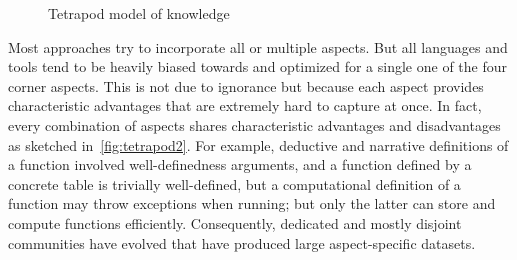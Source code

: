 \begin{figure}[hbt]
\begin{center}
\end{center}
\caption{Tetrapod model of knowledge}\label{fig:tetrapod}
\end{figure}

Most approaches try to incorporate all or multiple aspects.
But all languages and tools tend to be heavily biased towards and optimized for a single one of the four corner aspects.
This is not due to ignorance but because each aspect provides characteristic advantages that are extremely hard to capture at once.
In fact, every combination of aspects shares characteristic advantages and disadvantages as sketched in~\autoref{fig:tetrapod2}.
For example, deductive and narrative definitions of a function involved well-definedness arguments, and a function defined by a concrete table is trivially well-defined, but a computational definition of a function may throw exceptions when running; but only the latter can store and compute functions efficiently.
Consequently, dedicated and mostly disjoint communities have evolved that have produced large aspect-specific datasets.

